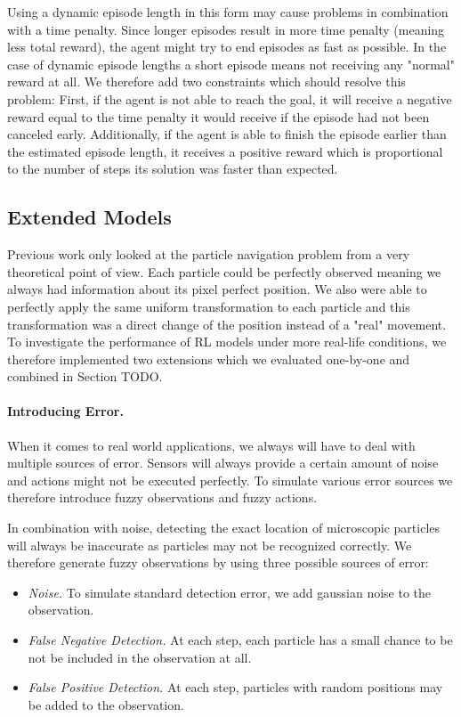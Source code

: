 Using a dynamic episode length in this form may cause problems in combination with a time penalty. Since longer episodes result in more time penalty (meaning less total reward), the agent might try to end episodes as fast as possible. In the case of dynamic episode lengths a short episode means not receiving any "normal" reward at all. We therefore add two constraints which should resolve this problem: First, if the agent is not able to reach the goal, it will receive a negative reward equal to the time penalty it would receive if the episode had not been canceled early. Additionally, if the agent is able to finish the episode earlier than the estimated episode length, it receives a positive reward which is proportional to the number of steps its solution was faster than expected.

\subsection{Extended Models} \label{sec:ExtendedMaze}
Previous work only looked at the particle navigation problem from a very theoretical point of view. Each particle could be perfectly observed meaning we always had information about its pixel perfect position. We also were able to perfectly apply the same uniform transformation to each particle and this transformation was a direct change of the position instead of a "real" movement. To investigate the performance of RL models under more real-life conditions, we therefore implemented two extensions which we evaluated one-by-one and combined in Section TODO.

\paragraph{Introducing Error.}
When it comes to real world applications, we always will have to deal with multiple sources of error. Sensors will always provide a certain amount of noise and actions might not be executed perfectly. To simulate various error sources we therefore introduce fuzzy observations and fuzzy actions.  

In combination with noise, detecting the exact location of microscopic particles will always be inaccurate as particles may not be recognized correctly. We therefore generate fuzzy observations by using three possible sources of error:

\begin{itemize}
    \item \textit{Noise.} To simulate standard detection error, we add gaussian noise to the observation.
    \item \textit{False Negative Detection.} At each step, each particle has a small chance to be not be included in the observation at all.
    \item \textit{False Positive Detection.} At each step, particles with random positions may be added to the observation.
\end{itemize}


